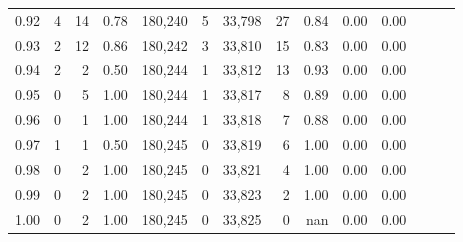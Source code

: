 \begin{tabular}{rrrrrrrrrrrrrr}
0.92 &      4 &     14 &  0.78 &  180,240 &        5 &  33,798 &      27 &  0.84 &  0.00 &      0.00 \\
0.93 &      2 &     12 &  0.86 &  180,242 &        3 &  33,810 &      15 &  0.83 &  0.00 &      0.00 \\
0.94 &      2 &      2 &  0.50 &  180,244 &        1 &  33,812 &      13 &  0.93 &  0.00 &      0.00 \\
0.95 &      0 &      5 &  1.00 &  180,244 &        1 &  33,817 &       8 &  0.89 &  0.00 &      0.00 \\
0.96 &      0 &      1 &  1.00 &  180,244 &        1 &  33,818 &       7 &  0.88 &  0.00 &      0.00 \\
0.97 &      1 &      1 &  0.50 &  180,245 &        0 &  33,819 &       6 &  1.00 &  0.00 &      0.00 \\
0.98 &      0 &      2 &  1.00 &  180,245 &        0 &  33,821 &       4 &  1.00 &  0.00 &      0.00 \\
0.99 &      0 &      2 &  1.00 &  180,245 &        0 &  33,823 &       2 &  1.00 &  0.00 &      0.00 \\
1.00 &      0 &      2 &  1.00 &  180,245 &        0 &  33,825 &       0 &   nan &  0.00 &      0.00 \\
\bottomrule
\end{tabular}
